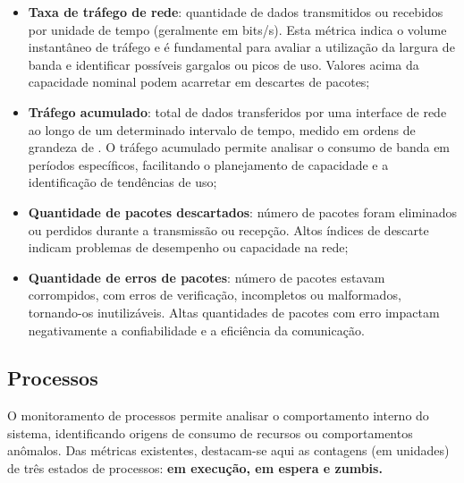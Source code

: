 \begin{itemize}
    \item \textbf{Taxa de tráfego de rede}: quantidade de dados transmitidos ou recebidos por unidade de tempo (geralmente em bits/s). Esta métrica indica o volume instantâneo de tráfego e é fundamental para avaliar a utilização da largura de banda e identificar possíveis gargalos ou picos de uso. Valores acima da capacidade nominal podem acarretar em descartes de pacotes;
    \item \textbf{Tráfego acumulado}: total de dados transferidos por uma interface de rede ao longo de um determinado intervalo de tempo, medido em ordens de grandeza de . O tráfego acumulado permite analisar o consumo de banda em períodos específicos, facilitando o planejamento de capacidade e a identificação de tendências de uso;
    \item \textbf{Quantidade de pacotes descartados}: número de pacotes foram eliminados ou perdidos durante a transmissão ou recepção. Altos índices de descarte indicam problemas de desempenho ou capacidade na rede;
    \item \textbf{Quantidade de erros de pacotes}: número de pacotes estavam corrompidos, com erros de verificação, incompletos ou malformados, tornando-os inutilizáveis. Altas quantidades de pacotes com erro impactam negativamente a confiabilidade e a eficiência da comunicação.
\end{itemize}


\subsection{Processos}
\label{subsection:Processos}

O monitoramento de processos \citep{processmetrics2025} permite analisar o comportamento interno do sistema, identificando origens de consumo de recursos ou comportamentos anômalos. Das métricas existentes, destacam-se aqui as contagens (em unidades) de três estados de processos: \textbf{em execução, em espera e zumbis.}

